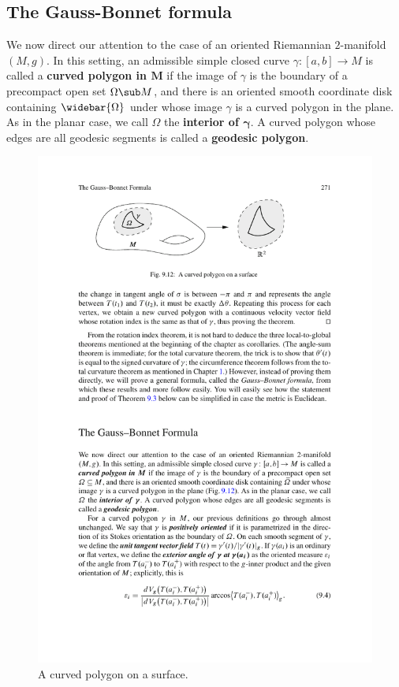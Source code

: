 \subsection{The Gauss-Bonnet formula}
We now direct our attention to the case of an oriented Riemannian $2$-manifold $(M,g)$. In this setting, an admissible simple closed curve $\gamma:[a,b]\to M$ is called a 
\textbf{curved polygon in $\bm{M}$} if the image of $\gamma$ is the boundary of a precompact open set $\Omega\sub M$, and there is an oriented smooth coordinate disk 
containing $\widebar{\Omega}$ under whose image $\gamma$ is a curved polygon in the plane. As in the planar case, we call $\Omega$ the \textbf{interior of $\bm{\gamma}$}. 
A curved polygon whose edges are all geodesic segments is called a \textbf{geodesic polygon}.
\begin{figure}[htbp]
\centering
\includegraphics{pictures/curved-polygon-surface}
\caption{A curved polygon on a surface.}
\end{figure}

